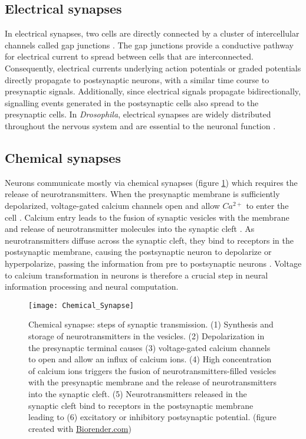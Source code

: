 \subsection{Electrical synapses}
In electrical synapses, two cells are directly connected by a cluster of intercellular channels called gap junctions \parencite{Bennett2004}. The gap junctions provide a conductive pathway for electrical current to spread between cells that are interconnected. Consequently, electrical currents underlying action potentials or graded potentials directly propagate to postsynaptic neurons, with a similar time course to presynaptic signals. Additionally, since electrical signals propagate bidirectionally, signalling events generated in the postsynaptic cells also spread to the presynaptic cells. In \textit{Drosophila}, electrical synapses are widely distributed throughout the nervous system and are essential to the neuronal function \parencite{Ammer2022}.



\subsection{Chemical synapses}
Neurons communicate mostly via chemical synapses (figure  \ref{fig:chemicalsynapse}) which requires the release of neurotransmitters. When the presynaptic membrane is sufficiently depolarized, voltage-gated calcium channels open and allow $Ca^{2+}$ to enter the cell \parencite{Luo2020}. Calcium entry leads to the fusion of synaptic vesicles with the membrane and release of neurotransmitter molecules into the synaptic cleft \parencite{Chapman2002}.  As neurotransmitters diffuse across the synaptic cleft, they bind to receptors in the postsynaptic membrane, causing the postsynaptic neuron to depolarize or hyperpolarize, passing the information from pre to postsynaptic neurons \parencite{Maio2008}. Voltage to calcium transformation in neurons is therefore a crucial step in neural information processing and neural computation. 

\begin{figure}
\centering
\hspace*{-1cm} 
\texttt{[image: Chemical\_Synapse]}
\caption[Chemical synapse: steps of synaptic transmission] {Chemical synapse: steps of synaptic transmission. (1) Synthesis and storage of neurotransmitters in the vesicles. (2) Depolarization in the presynaptic terminal causes (3) voltage-gated calcium channels to open and allow an influx of calcium ions. (4) High concentration of calcium ions triggers the fusion of neurotransmitters-filled vesicles with the presynaptic membrane and the release of neurotransmitters into the synaptic cleft. (5) Neurotransmitters released in the synaptic cleft bind to receptors in the postsynaptic membrane leading to (6) excitatory or inhibitory postsynaptic potential. (figure created with \href{https://app.biorender.com/biorender-templates}{Biorender.com})}
\label{fig:chemicalsynapse}
\end{figure}

